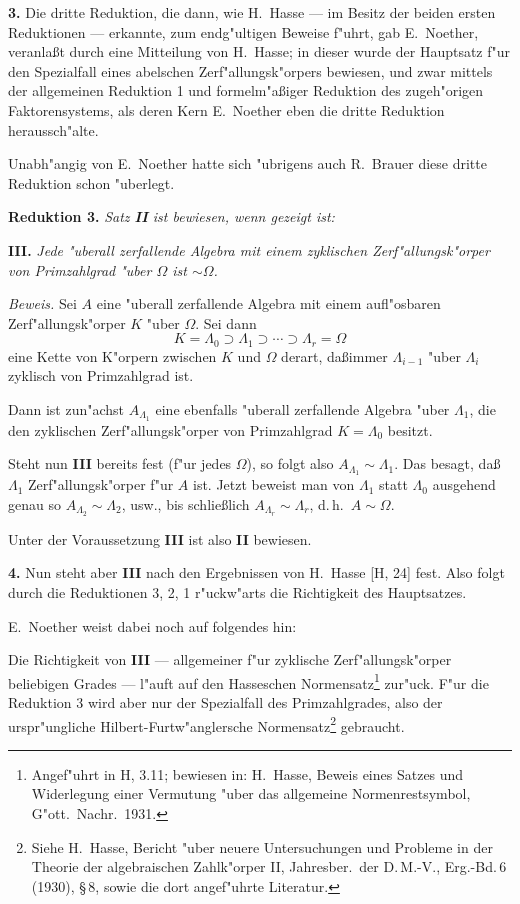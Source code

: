 \documentclass[12pt,a4paper]{article}
\theoremstyle{plain}
\begin{document}
\medskip\noindent\textbf{3.}
Die dritte Reduktion, die dann, wie H.\ Hasse --- im Besitz der beiden ersten Reduktionen --- erkannte, zum endg"ultigen Beweise f"uhrt, gab E.\ Noether, veranla\ss t durch eine Mitteilung von H.\ Hasse; in dieser wurde der Hauptsatz f"ur den Spezialfall eines abelschen Zerf"allungsk"orpers bewiesen, und zwar mittels der allgemeinen Reduktion 1 und formelm"a\ss iger Reduktion des zugeh"origen Faktorensystems, als deren Kern E.\ Noether eben die dritte Reduktion heraussch"alte.

Unabh"angig von E.\ Noether hatte sich "ubrigens auch R.\ Brauer diese dritte Reduktion schon "uberlegt.

\noindent\textbf{Reduktion 3.}
\textit{Satz \textbf{II} ist bewiesen, wenn gezeigt ist:}

\smallskip
\textbf{III.} \textit{Jede "uberall zerfallende Algebra mit einem zyklischen Zerf"allungsk"orper von Primzahlgrad "uber $\Omega$ ist $\sim \Omega$.}

\noindent\textit{Beweis.}
Sei $A$ eine "uberall zerfallende Algebra mit einem aufl"osbaren Zerf"allungsk"orper $K$ "uber $\Omega$. Sei dann
\[
K = \Lambda_0 \supset \Lambda_1 \supset \cdots \supset \Lambda_r = \Omega
\]
eine Kette von K"orpern zwischen $K$ und $\Omega$ derart, da\ss immer $\Lambda_{i-1}$ "uber $\Lambda_i$ zyklisch von Primzahlgrad ist.

Dann ist zun"achst $A_{\Lambda_1}$ eine ebenfalls "uberall zerfallende Algebra "uber $\Lambda_1$, die den zyklischen Zerf"allungsk"orper von Primzahlgrad $K = \Lambda_0$ besitzt.

Steht nun \textbf{III} bereits fest (f"ur jedes $\Omega$), so folgt also $A_{\Lambda_1} \sim \Lambda_1$. Das besagt, da\ss $\Lambda_1$ Zerf"allungsk"orper f"ur $A$ ist. Jetzt beweist man von $\Lambda_1$ statt $\Lambda_0$ ausgehend genau so $A_{\Lambda_2} \sim \Lambda_2$, usw., bis schlie\ss lich $A_{\Lambda_r} \sim \Lambda_r$, d.\,h.\ $A \sim \Omega$.

Unter der Voraussetzung \textbf{III} ist also \textbf{II} bewiesen.

\medskip\noindent\textbf{4.}
Nun steht aber \textbf{III} nach den Ergebnissen von H.\ Hasse [H, 24] fest. Also folgt durch die Reduktionen 3, 2, 1 r"uckw"arts die Richtigkeit des Hauptsatzes.

E.\ Noether weist dabei noch auf folgendes hin:

Die Richtigkeit von \textbf{III} --- allgemeiner f"ur zyklische Zerf"allungsk"orper beliebigen Grades --- l"auft auf den Hasseschen Normensatz\footnote{Angef"uhrt in H, 3.11; bewiesen in: H.\ Hasse, Beweis eines Satzes und Widerlegung einer Vermutung "uber das allgemeine Normenrestsymbol, G"ott.\ Nachr.\ 1931.} zur"uck. F"ur die Reduktion 3 wird aber nur der Spezialfall des Primzahlgrades, also der urspr"ungliche Hilbert-Furtw"anglersche Normensatz\footnote{Siehe H.\ Hasse, Bericht "uber neuere Untersuchungen und Probleme in der Theorie der algebraischen Zahlk"orper II, Jahresber.\ der D.\,M.-V., Erg.-Bd.\,6 (1930), \S\,8, sowie die dort angef"uhrte Literatur.} gebraucht.
\end{document}
